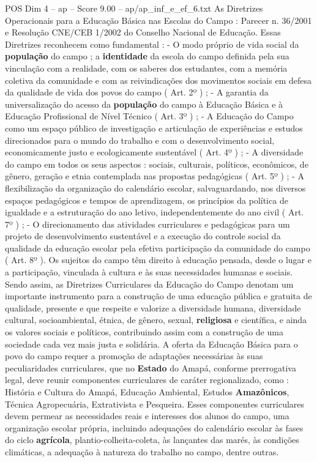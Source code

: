 \begin{textsample}{POS Dim 4 – ap – Score 9.00 – ap/ap\_inf\_e\_ef\_6.txt}
As Diretrizes Operacionais para a Educação Básica nas Escolas do Campo : Parecer n. 36/2001 e Resolução CNE/CEB 1/2002 do Conselho Nacional de Educação.
Essas Diretrizes reconhecem como fundamental : - O modo próprio de vida social da \textbf{população} do campo ; a \textbf{identidade} da escola do campo definida pela sua vinculação com a realidade, com os saberes dos estudantes, com a memória coletiva da comunidade e com as reivindicações dos movimentos sociais em defesa da qualidade de vida dos povos do campo ( Art. 2º ) ; - A garantia da universalização do acesso da \textbf{população} do campo à Educação Básica e à Educação Profissional de Nível Técnico ( Art. 3º ) ; - A Educação do Campo como um espaço público de investigação e articulação de experiências e estudos direcionados para o mundo do trabalho e com o desenvolvimento social, economicamente justo e ecologicamente sustentável ( Art. 4º ) ; - A diversidade do campo em todos os seus aspectos : sociais, culturais, políticos, econômicos, de gênero, geração e etnia contemplada nas propostas pedagógicas ( Art. 5º ) ; - A flexibilização da organização do calendário escolar, salvaguardando, nos diversos espaços pedagógicos e tempos de aprendizagem, os princípios da política de igualdade e a estruturação do ano letivo, independentemente do ano civil ( Art. 7º ) ; - O direcionamento das atividades curriculares e pedagógicas para um projeto de desenvolvimento sustentável e a execução do controle social da qualidade da educação escolar pela efetiva participação da comunidade do campo ( Art. 8º ).
Os sujeitos do campo têm direito à educação pensada, desde o lugar e a participação, vinculada à cultura e às suas necessidades humanas e sociais.
Sendo assim, as Diretrizes Curriculares da Educação do Campo denotam um importante instrumento para a construção de uma educação pública e gratuita de qualidade, presente e que respeite e valorize a diversidade humana, diversidade cultural, socioambiental, étnica, de gênero, sexual, \textbf{religiosa} e científica, e ainda os valores sociais e políticos, contribuindo assim com a construção de uma sociedade cada vez mais justa e solidária.
A oferta da Educação Básica para o povo do campo requer a promoção de adaptações necessárias às suas peculiaridades curriculares, que no \textbf{Estado} do Amapá, conforme prerrogativa legal, deve reunir componentes curriculares de caráter regionalizado, como : História e Cultura do Amapá, Educação Ambiental, Estudos \textbf{Amazônicos}, Técnica Agropecuária, Extrativista e Pesqueira.
Esses componentes curriculares devem permear as necessidades reais e interesses dos alunos do campo, uma organização escolar própria, incluindo adequações do calendário escolar às fases do ciclo \textbf{agrícola}, plantio-colheita-coleta, às lançantes das marés, às condições climáticas, a adequação à natureza do trabalho no campo, dentre outras.

\end{textsample}
